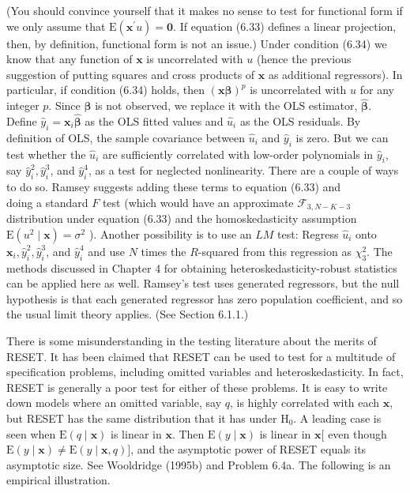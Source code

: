 \documentclass[10pt]{article}
\begin{document}
(You should convince yourself that it makes no sense to test for functional form if we only assume that $\mathrm{E}\left(\mathbf{x}^{\prime} u\right)=\mathbf{0}$. If equation (6.33) defines a linear projection, then, by definition, functional form is not an issue.) Under condition (6.34) we know that any function of $\mathbf{x}$ is uncorrelated with $u$ (hence the previous suggestion of putting squares and cross products of $\mathbf{x}$ as additional regressors). In particular, if condition (6.34) holds, then $(\mathbf{x} \boldsymbol{\beta})^{p}$ is uncorrelated with $u$ for any integer $p$. Since $\boldsymbol{\beta}$ is not observed, we replace it with the OLS estimator, $\hat{\boldsymbol{\beta}}$. Define $\hat{y}_{i}=\mathbf{x}_{i} \hat{\boldsymbol{\beta}}$ as the OLS fitted values and $\hat{u}_{i}$ as the OLS residuals. By definition of OLS, the sample covariance between $\hat{u}_{i}$ and $\hat{y}_{i}$ is zero. But we can test whether the $\hat{u}_{i}$ are sufficiently correlated with low-order polynomials in $\hat{y}_{i}$, say $\hat{y}_{i}^{2}, \hat{y}_{i}^{3}$, and $\hat{y}_{i}^{4}$, as a test for neglected nonlinearity. There are a couple of ways to do so. Ramsey suggests adding these terms to equation (6.33) and\\
doing a standard $F$ test (which would have an approximate $\mathscr{F}_{3, N-K-3}$ distribution under equation (6.33) and the homoskedasticity assumption $\mathrm{E}\left(u^{2} \mid \mathbf{x}\right)=\sigma^{2}$ ). Another possibility is to use an $L M$ test: Regress $\hat{u}_{i}$ onto $\mathbf{x}_{i}, \hat{y}_{i}^{2}, \hat{y}_{i}^{3}$, and $\hat{y}_{i}^{4}$ and use $N$ times the $R$-squared from this regression as $\chi_{3}^{2}$. The methods discussed in Chapter 4 for obtaining heteroskedasticity-robust statistics can be applied here as well. Ramsey's test uses generated regressors, but the null hypothesis is that each generated regressor has zero population coefficient, and so the usual limit theory applies. (See Section 6.1.1.)

There is some misunderstanding in the testing literature about the merits of RESET. It has been claimed that RESET can be used to test for a multitude of specification problems, including omitted variables and heteroskedasticity. In fact, RESET is generally a poor test for either of these problems. It is easy to write down models where an omitted variable, say $q$, is highly correlated with each $\mathbf{x}$, but RESET has the same distribution that it has under $\mathrm{H}_{0}$. A leading case is seen when $\mathrm{E}(q \mid \mathbf{x})$ is linear in $\mathbf{x}$. Then $\mathrm{E}(y \mid \mathbf{x})$ is linear in $\mathbf{x}[$ even though $\mathrm{E}(y \mid \mathbf{x}) \neq \mathrm{E}(y \mid \mathbf{x}, q)]$, and the asymptotic power of RESET equals its asymptotic size. See Wooldridge (1995b) and Problem 6.4a. The following is an empirical illustration.
\end{document}
